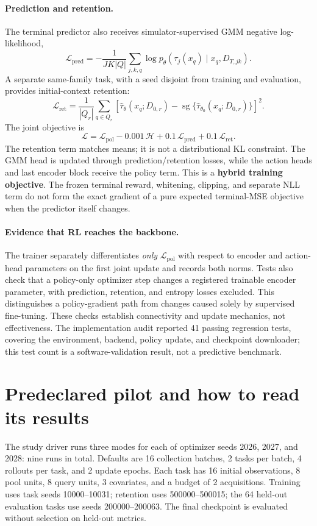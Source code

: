 \documentclass[10pt,a4paper]{article}
\newcommand{\sg}{\operatorname{sg}}
\begin{document}
\paragraph{Prediction and retention.}
The terminal predictor also receives simulator-supervised GMM negative
log-likelihood,
\[
 \mathcal L_{\mathrm{pred}}=-\frac1{JK|Q|}\sum_{j,k,q}
 \log p_\theta(\tau_j(x_q)\mid x_q,D_{T,jk}).
\]
A separate same-family task, with a seed disjoint from training and evaluation,
provides initial-context retention:
\[
 \mathcal L_{\mathrm{ret}}=\frac1{|Q_r|}\sum_{q\in Q_r}
 [\widehat\tau_\theta(x_q;D_{0,r})-
 \sg\{\widehat\tau_{\theta_0}(x_q;D_{0,r})\}]^2.
\]
The joint objective is
\[
 \boxed{\mathcal L=\mathcal L_{\mathrm{pol}}-0.001\,\mathcal H
       +0.1\,\mathcal L_{\mathrm{pred}}+0.1\,\mathcal L_{\mathrm{ret}}.}
\]
The retention term matches means; it is not a distributional KL constraint.
The GMM head is updated through prediction/retention losses, while the action
heads and last encoder block receive the policy term. This is a
\textbf{hybrid training objective}. The frozen terminal reward, whitening,
clipping, and separate NLL term do not form the exact gradient of a pure
expected terminal-MSE objective when the predictor itself changes.

\paragraph{Evidence that RL reaches the backbone.}
The trainer separately differentiates \emph{only}
$\mathcal L_{\mathrm{pol}}$ with respect to encoder and action-head parameters
on the first joint update and records both norms. Tests also check that a
policy-only optimizer step changes a registered trainable encoder parameter,
with prediction, retention, and entropy losses excluded. This distinguishes
a policy-gradient path from changes caused solely by supervised fine-tuning.
These checks establish connectivity and update mechanics, not effectiveness.
The implementation audit reported 41 passing regression tests, covering the
environment, backend, policy update, and checkpoint downloader; this test
count is a software-validation result, not a predictive benchmark.

\newpage
\section{Predeclared pilot and how to read its results}
The study driver runs three modes for each of optimizer seeds 2026, 2027, and
2028: nine runs in total. Defaults are 16 collection batches, 2 tasks per batch,
4 rollouts per task, and 2 update epochs. Each task has 16 initial observations,
8 pool units, 8 query units, 3 covariates, and a budget of 2 acquisitions.
Training uses task seeds 10000--10031; retention uses 500000--500015; the
64 held-out evaluation tasks use seeds 200000--200063. The final checkpoint is
evaluated without selection on held-out metrics.
\end{document}
